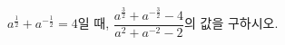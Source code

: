 $a^{\frac{1}{2}}+a^{-\frac{1}{2}}=4$일 때, $\dfrac{a^{\frac{3}{2}}+a^{-\frac{3}{2}}-4}{a^{2}+a^{-2}-2}$의 값을 구하시오. 
